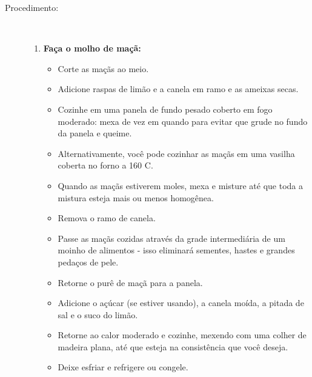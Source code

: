 \documentclass [11pt, letterpaper] {article}
\begin{document}
\begin {description}
\item [Procedimento:] \ \\
\begin {enumerate}
\item {\bf Fa\c{c}a o molho de maçã:} 
\begin {itemize}
\item Corte as maçãs ao meio.
\item Adicione raspas de limão e a canela em ramo e as ameixas secas.
\item Cozinhe em uma panela de fundo pesado coberto em fogo moderado: mexa de vez em quando para evitar que grude no fundo da panela e queime.
\item Alternativamente, você pode cozinhar as maçãs em uma vasilha coberta no forno a 160 C.
\item Quando as maçãs estiverem moles, mexa e misture até que toda a mistura esteja mais ou menos homog\^enea.
\item Remova o ramo de canela.
\item Passe as maçãs cozidas através da grade intermediária de um moinho de alimentos - isso eliminará sementes, hastes e grandes pedaços de pele.
\item Retorne o purê de maçã para a panela.
\item Adicione o açúcar (se estiver usando), a canela moída, a pitada de sal e o suco do limão.
\item Retorne ao calor moderado e cozinhe, mexendo com uma colher de madeira plana, até que esteja na consistência que você deseja.
\item Deixe esfriar e refrigere ou congele.
\end {itemize}


\end{enumerate}
\end{description}
\end{document}
